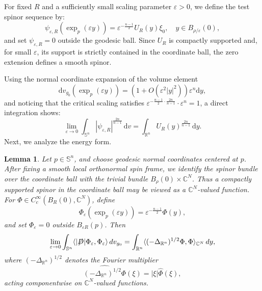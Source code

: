 \documentclass[a4paper, 12pt]{article}
\newtheorem{lemma}[theorem]{Lemma}
\def\slashiii#1{\setbox0=\hbox{$#1$}#1\hskip-\wd0\hbox to\wd0{\hss\sl/\/\hss}}
\begin{document}
For fixed $R$ and a sufficiently small scaling parameter $\varepsilon > 0$, we define the test spinor sequence by:
$$
\psi_{\varepsilon,R}(\exp_p(\varepsilon y)) = \varepsilon^{-\frac{n-1}{2}} U_R(y) \xi_0, \quad y \in B_{\rho/\varepsilon}(0),
$$
and set $\psi_{\varepsilon,R} = 0$ outside the geodesic ball. Since \(U_R\) is compactly supported and, for small \(\varepsilon\), its support is strictly contained in the coordinate ball, the zero extension defines a smooth spinor.

Using the normal coordinate expansion of the volume element $$
\text{d}v_{g_0}(\exp_p(\varepsilon y)) = \left( 1 + O(\varepsilon^2 |y|^2) \right) \varepsilon^n \text{d}y,
$$
and noticing that the critical scaling satisfies $\varepsilon^{-\frac{n-1}{2} \cdot \frac{2n}{n-1}} \cdot \varepsilon^n = 1$, a direct integration shows:
\begin{equation}\label{denominator}
	\lim_{\varepsilon \to 0} \int_{\mathbb{S}^n} |\psi_{\varepsilon,R}|^{\frac{2n}{n-1}} \, \text{d}v = \int_{\mathbb{R}^n} U_R(y)^{\frac{2n}{n-1}} \, \text{d}y.
\end{equation}
Next, we analyze the energy form. 
\begin{lemma}
	Let \(p\in\mathbb S^n\), and choose geodesic normal coordinates centered at
	\(p\). After fixing a smooth local orthonormal spin frame, we identify the
	spinor bundle over the coordinate ball with the trivial bundle
	\(B_\rho(0)\times\mathbb C^N\). Thus a compactly supported spinor in the
	coordinate ball may be viewed as a \(\mathbb C^N\)-valued function. For \(\Phi\in C_c^\infty(B_R(0),\mathbb C^N)\), define
	\[
	\Phi_\varepsilon(\exp_p(\varepsilon y))
	=
	\varepsilon^{-\frac{n-1}{2}}\Phi(y),
	\]
	and set \(\Phi_\varepsilon=0\) outside \(B_{\varepsilon R}(p)\). Then
	\begin{equation}\label{numerator}
	\lim_{\varepsilon\to0}
	\int_{\mathbb S^n}
	\langle |\slashiii{D}|\Phi_\varepsilon,\Phi_\varepsilon\rangle\,dv_{g_0}
	=
	\int_{\mathbb R^n}
	\langle (-\Delta_{\mathbb R^n})^{1/2}\Phi,\Phi\rangle_{\mathbb C^N}\,dy,
	\end{equation}
	where \((-\Delta_{\mathbb R^n})^{1/2}\) denotes the Fourier multiplier
	\[
	\widehat{(-\Delta_{\mathbb R^n})^{1/2}\Phi}(\xi)	=|\xi|\widehat{\Phi}(\xi),
	\]
	acting componentwise on \(\mathbb C^N\)-valued functions.
\end{lemma}
\end{document}
